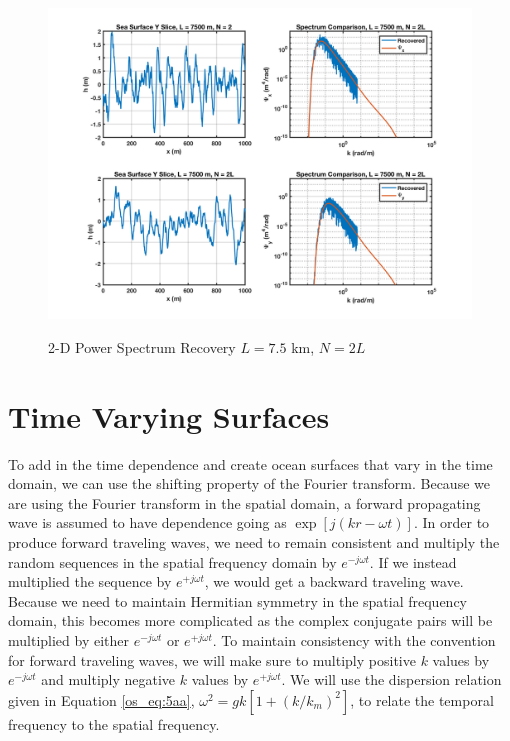 \begin{figure}[ht]
  \begin{center}
\includegraphics[width=6in]{../media/Ocean_Surface/sea_surface_2d_slices_7500.png}
  \end{center}
  \renewcommand{\baselinestretch}{1} \small\normalsize
  \begin{quote}
    \caption[2-D Power Spectrum Recovery $L = 7.5$ km, $N = 2L$]{2-D Power Spectrum Recovery $L = 7.5$ km, $N = 2L$\label{os_fig:12a}}
  \end{quote}
\end{figure}
\renewcommand{\baselinestretch}{2} \small\normalsize

\section {Time Varying Surfaces}
To add in the time dependence and create ocean surfaces that vary in the time domain, we can use the shifting property of the Fourier transform. Because we are using the Fourier transform in the spatial domain, a forward propagating wave is assumed to have dependence going as $\exp[j(kr - \omega t)]$. In order to produce forward traveling waves, we need to remain consistent and multiply the random sequences in the spatial frequency domain by $e^{-j\omega t}$. If we instead multiplied the sequence by $e^{+j\omega t}$, we would get a backward traveling wave. Because we need to maintain Hermitian symmetry in the spatial frequency domain, this becomes more complicated as the complex conjugate pairs will be multiplied by either $e^{-j\omega t}$ or $e^{+j\omega t}$. To maintain consistency with the convention for forward traveling waves, we will make sure to multiply positive $k$ values by $e^{-j\omega t}$ and multiply negative $k$ values by $e^{+j\omega t}$. We will use the dispersion relation given in Equation \ref{os_eq:5aa}, $\omega^2 = gk\left[1 +(k/k_m)^2 \right]$, to relate the temporal frequency to the spatial frequency. 

